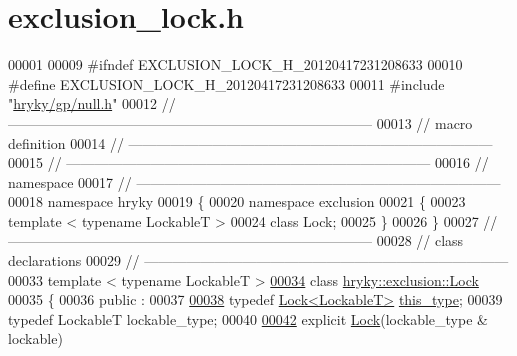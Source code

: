 \hypertarget{exclusion__lock_8h_source}{\section{exclusion\-\_\-lock.\-h}
}

\begin{DoxyCode}
00001 
00009 \textcolor{preprocessor}{#ifndef EXCLUSION\_LOCK\_H\_20120417231208633}
00010 \textcolor{preprocessor}{}\textcolor{preprocessor}{#define EXCLUSION\_LOCK\_H\_20120417231208633}
00011 \textcolor{preprocessor}{}\textcolor{preprocessor}{#include "\hyperlink{null_8h}{hryky/gp/null.h}"}
00012 \textcolor{comment}{//
      ------------------------------------------------------------------------------}
00013 \textcolor{comment}{// macro definition}
00014 \textcolor{comment}{//
      ------------------------------------------------------------------------------}
00015 \textcolor{comment}{//
      ------------------------------------------------------------------------------}
00016 \textcolor{comment}{// namespace}
00017 \textcolor{comment}{//
      ------------------------------------------------------------------------------}
00018 \textcolor{keyword}{namespace }hryky
00019 \{
00020 \textcolor{keyword}{namespace }exclusion
00021 \{
00023     \textcolor{keyword}{template} < \textcolor{keyword}{typename} LockableT >
00024     \textcolor{keyword}{class }Lock;
00025 \}
00026 \}
00027 \textcolor{comment}{//
      ------------------------------------------------------------------------------}
00028 \textcolor{comment}{// class declarations}
00029 \textcolor{comment}{//
      ------------------------------------------------------------------------------}
00033 \textcolor{comment}{}\textcolor{keyword}{template} < \textcolor{keyword}{typename} LockableT >
\hypertarget{exclusion__lock_8h_source_l00034}{}\hyperlink{classhryky_1_1exclusion_1_1_lock}{00034} \textcolor{keyword}{class }\hyperlink{classhryky_1_1exclusion_1_1_lock}{hryky::exclusion::Lock}
00035 \{
00036 \textcolor{keyword}{public} :
00037 
\hypertarget{exclusion__lock_8h_source_l00038}{}\hyperlink{classhryky_1_1exclusion_1_1_lock_a56d8dcfe2f3ba647f586c526031c56e6}{00038}     \textcolor{keyword}{typedef} \hyperlink{classhryky_1_1exclusion_1_1_lock}{Lock<LockableT>}     \hyperlink{classhryky_1_1exclusion_1_1_lock_a56d8dcfe2f3ba647f586c526031c56e6}{this_type};
00039     \textcolor{keyword}{typedef} LockableT           lockable\_type;
00040 
\hypertarget{exclusion__lock_8h_source_l00042}{}\hyperlink{classhryky_1_1exclusion_1_1_lock_a742be489a570c6005ea504e815433a97}{00042}     \textcolor{keyword}{explicit} \hyperlink{classhryky_1_1exclusion_1_1_lock_a742be489a570c6005ea504e815433a97}{Lock}(lockable\_type & lockable)

\end{DoxyCode}
